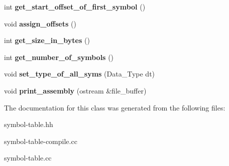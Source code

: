 \begin{DoxyCompactItemize}
int {\bfseries get\+\_\+start\+\_\+offset\+\_\+of\+\_\+first\+\_\+symbol} ()
\item 
\mbox{\label{classSymbol__Table_a20fb616f3275c2e58747731213483b71}} 
void {\bfseries assign\+\_\+offsets} ()
\item 
\mbox{\label{classSymbol__Table_ab01c9462e323f0363c5842e5ca3d7aba}} 
int {\bfseries get\+\_\+size\+\_\+in\+\_\+bytes} ()
\item 
\mbox{\label{classSymbol__Table_aa495c1898e665258388ceeb3196e6bc7}} 
int {\bfseries get\+\_\+number\+\_\+of\+\_\+symbols} ()
\item 
\mbox{\label{classSymbol__Table_ad6dcadbd08d3c18311725debcabfaa33}} 
void {\bfseries set\+\_\+type\+\_\+of\+\_\+all\+\_\+syms} (Data\+\_\+\+Type dt)
\item 
\mbox{\label{classSymbol__Table_ac20656a23e2b2f1c6c6360367bd4f763}} 
void {\bfseries print\+\_\+assembly} (ostream \&file\+\_\+buffer)
\end{DoxyCompactItemize}


The documentation for this class was generated from the following files\+:\begin{DoxyCompactItemize}
\item 
symbol-\/table.\+hh\item 
symbol-\/table-\/compile.\+cc\item 
symbol-\/table.\+cc\end{DoxyCompactItemize}
